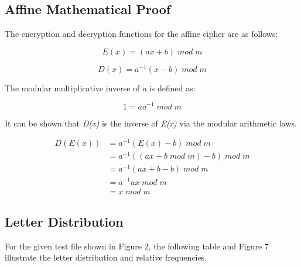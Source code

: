 \documentclass[]{article}
\begin{document}
\subsection*{Affine Mathematical Proof}

The encryption and decryption functions for the affine cipher are as follows:

$$E(x)=(ax+b)\;mod\;m$$

$$D(x)=a^{-1}(x-b)\;mod\;m$$

\vspace{0.5cm}

The modular multiplicative inverse of \textit{a} is defined as:

$$1=aa^{-1}\;mod\;m$$

It can be shown that \textit{D(x)} is the inverse of \textit{E(x)} via the modular arithmetic laws.

\begin{equation*}
\begin{split}
D(E(x)) & = a^{-1}(E(x)-b)\;mod\;m \\
& = a^{-1}(( ax+b\;mod\;m )-b)\;mod\;m \\
& = a^{-1} (ax+b-b) \;mod\;m \\
& = a^{-1}ax\;mod\;m \\
& = x\;mod\;m
\end{split}
\end{equation*}




\subsection*{Letter Distribution}

For the given test file shown in Figure 2, the following table and Figure 7 illustrate the letter distribution and relative frequencies.
\end{document}
